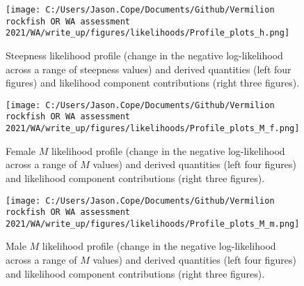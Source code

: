 \documentclass[11pt,
  english,
  a4paper,
]{article}
\begin{document}
\tagmcend\tagstructend


\begin{figure}
\centering
\texttt{[image: C:/Users/Jason.Cope/Documents/Github/Vermilion rockfish OR WA assessment 2021/WA/write\_up/figures/likelihoods/Profile\_plots\_h.png]}
\caption{Steepness likelihood profile (change in the negative log-likelihood across a range of steepness values) and derived quantities (left four figures) and likelihood component contributions (right three figures).\label{fig:steepness-profile-combo}}
\end{figure}

\tagmcend\tagstructend


\begin{figure}
\centering
\texttt{[image: C:/Users/Jason.Cope/Documents/Github/Vermilion rockfish OR WA assessment 2021/WA/write\_up/figures/likelihoods/Profile\_plots\_M\_f.png]}
\caption{Female {\(M\)\leavevmode\tagmcend\tagstructend} likelihood profile (change in the negative log-likelihood across a range of {\(M\)\leavevmode\tagmcend\tagstructend} values) and derived quantities (left four figures) and likelihood component contributions (right three figures).\label{fig:M_f-profile-combo}}
\end{figure}

\tagmcend\tagstructend


\begin{figure}
\centering
\texttt{[image: C:/Users/Jason.Cope/Documents/Github/Vermilion rockfish OR WA assessment 2021/WA/write\_up/figures/likelihoods/Profile\_plots\_M\_m.png]}
\caption{Male {\(M\)\leavevmode\tagmcend\tagstructend} likelihood profile (change in the negative log-likelihood across a range of {\(M\)\leavevmode\tagmcend\tagstructend} values) and derived quantities (left four figures) and likelihood component contributions (right three figures).\label{fig:M_m-profile-combo}}
\end{figure}
\end{document}
